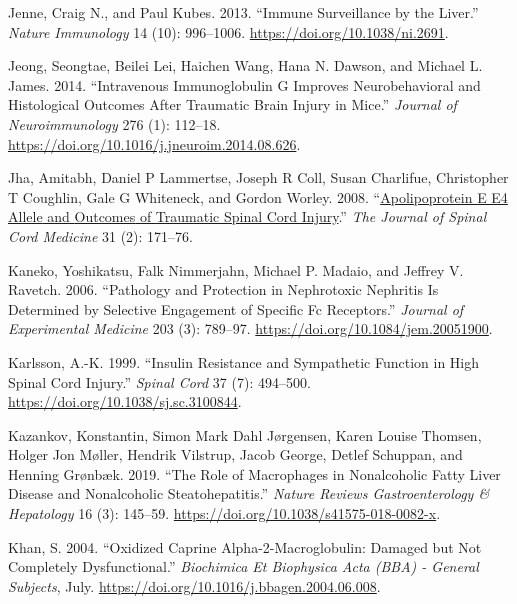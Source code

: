 \documentclass[9pt,lineno]{elife}
\newlength{\cslhangindent}
\newlength{\cslentryspacingunit} %
\newenvironment{CSLReferences}[2] %
 {%
  \setlength{\parindent}{0pt}
  \ifodd #1
  \let\oldpar\par
  \def\par{\hangindent=\cslhangindent\oldpar}
  \fi
  \setlength{\parskip}{#2\cslentryspacingunit}
 }%
 {}
\begin{document}
\begin{landscape}
\begin{landscape}
\begin{landscape}
\begin{landscape}
\begin{CSLReferences}{1}{0}
\leavevmode{}%
Jenne, Craig N., and Paul Kubes. 2013. {``Immune Surveillance by the Liver.''} \emph{Nature Immunology} 14 (10): 996--1006. \url{https://doi.org/10.1038/ni.2691}.

\leavevmode{}%
Jeong, Seongtae, Beilei Lei, Haichen Wang, Hana N. Dawson, and Michael L. James. 2014. {``Intravenous Immunoglobulin {G} Improves Neurobehavioral and Histological Outcomes After Traumatic Brain Injury in Mice.''} \emph{Journal of Neuroimmunology} 276 (1): 112--18. \url{https://doi.org/10.1016/j.jneuroim.2014.08.626}.

\leavevmode{}%
Jha, Amitabh, Daniel P Lammertse, Joseph R Coll, Susan Charlifue, Christopher T Coughlin, Gale G Whiteneck, and Gordon Worley. 2008. {``\href{https://www.ncbi.nlm.nih.gov/pmc/articles/PMC2565476}{Apolipoprotein {E E4 Allele} and {Outcomes} of {Traumatic Spinal Cord Injury}}.''} \emph{The Journal of Spinal Cord Medicine} 31 (2): 171--76.

\leavevmode{}%
Kaneko, Yoshikatsu, Falk Nimmerjahn, Michael P. Madaio, and Jeffrey V. Ravetch. 2006. {``Pathology and Protection in Nephrotoxic Nephritis Is Determined by Selective Engagement of Specific {Fc} Receptors.''} \emph{Journal of Experimental Medicine} 203 (3): 789--97. \url{https://doi.org/10.1084/jem.20051900}.

\leavevmode{}%
Karlsson, A.-K. 1999. {``Insulin Resistance and Sympathetic Function in High Spinal Cord Injury.''} \emph{Spinal Cord} 37 (7): 494--500. \url{https://doi.org/10.1038/sj.sc.3100844}.

\leavevmode{}%
Kazankov, Konstantin, Simon Mark Dahl Jørgensen, Karen Louise Thomsen, Holger Jon Møller, Hendrik Vilstrup, Jacob George, Detlef Schuppan, and Henning Grønbæk. 2019. {``The Role of Macrophages in Nonalcoholic Fatty Liver Disease and Nonalcoholic Steatohepatitis.''} \emph{Nature Reviews Gastroenterology \& Hepatology} 16 (3): 145--59. \url{https://doi.org/10.1038/s41575-018-0082-x}.

\leavevmode{}%
Khan, S. 2004. {``Oxidized Caprine Alpha-2-Macroglobulin: Damaged but Not Completely Dysfunctional.''} \emph{Biochimica Et Biophysica Acta (BBA) - General Subjects}, July. \url{https://doi.org/10.1016/j.bbagen.2004.06.008}.


\end{CSLReferences}
\end{landscape}
\end{landscape}
\end{landscape}
\end{landscape}
\end{document}
